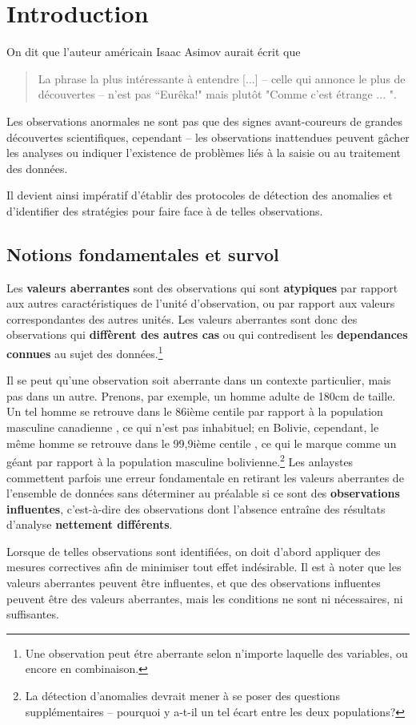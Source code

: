 \newpage\section{Introduction} On dit que l'auteur américain Isaac Asimov aurait \'ecrit que \begin{quote}La phrase la plus int\'eressante à entendre [...] -- celle qui annonce le plus de découvertes -- n'est pas ``Eurêka!" mais plutôt "Comme c'est \'etrange ... ".\end{quote}
Les ob\-ser\-va\-tions anormales ne sont pas que des signes avant-coureurs de grandes découvertes scientifiques, cependant -- les ob\-ser\-va\-tions inattendues peuvent gâcher les analyses ou indiquer l'existence de problèmes liés à la saisie ou au traitement des données. \par Il devient ainsi impératif  d'établir des protocoles de détection des anomalies et d'identifier des stratégies pour faire face à de telles ob\-ser\-va\-tions.
\subsection{Notions fondamentales et survol}
Les \textbf{valeurs aberrantes} sont des ob\-ser\-va\-tions qui sont \textbf{atypiques} par rapport aux autres caract\'eristiques de l'unit\'e d'ob\-ser\-vation, ou par rapport aux valeurs correspondantes des autres unit\'es. Les valeurs aberrantes sont donc des ob\-ser\-va\-tions qui  \textbf{diff\`erent des autres cas} ou qui contredisent les  \textbf{dependances connues} au sujet des donn\'ees.\footnote{Une ob\-ser\-va\-tion peut \'etre aberrante selon n'importe laquelle des variables, ou encore en combinaison.}%
\par Il se peut qu'une ob\-ser\-va\-tion soit aberrante dans un contexte particulier, mais pas dans un autre. Prenons, par exemple, un homme adulte de 180cm de taille. Un tel homme se retrouve dans le 86i\`eme centile par rapport \`a la population masculine canadienne \cite{DP_HPC}, ce qui n'est pas inhabituel; en Bolivie, cependant, le même homme se retrouve dans le 99,9i\`eme centile \cite{DP_HPC}, ce qui le marque comme un g\'eant par rapport \`a la population masculine bolivienne.\footnote{La détection d'anomalies devrait mener \`a se poser des questions suppl\'ementaires -- pourquoi y a-t-il un tel écart entre les deux populations?}
\newl
Les anlaystes commettent parfois une erreur fondamentale en retirant les valeurs aberrantes de l'ensemble de données sans d\'eterminer au pr\'ealable si ce sont des \textbf{ob\-ser\-va\-tions influentes}, c'est-à-dire des ob\-ser\-va\-tions dont l'absence entraîne des résultats d'analyse \textbf{nettement différents}.\par Lorsque de telles ob\-ser\-va\-tions sont identifiées, on doit d'abord appliquer des mesures correctives afin de minimiser tout effet ind\'esirable. Il est \`a noter que les valeurs aberrantes peuvent \^etre influentes, et que des ob\-ser\-va\-tions influentes peuvent être des valeurs aberrantes, mais les conditions ne sont ni nécessaires, ni suffisantes.
